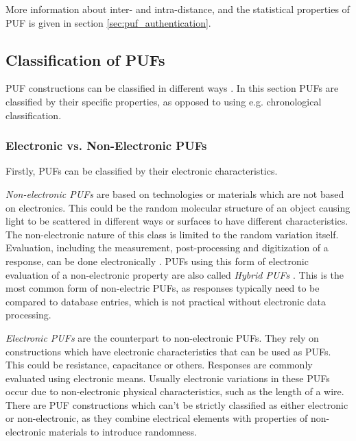 More information about inter- and intra-distance, and the statistical properties of PUF is given in section \ref{sec:puf_authentication}.

\subsection{Classification of PUFs}
\label{sec:classification}

PUF constructions can be classified in different ways \cite[][p. 4ff]{McGrath2019}.
In this section PUFs are classified by their specific properties, as opposed to using
e.g. chronological classification.

\subsubsection{Electronic vs. Non-Electronic PUFs}

Firstly, PUFs can be classified by their electronic characteristics. \cite[][p. 22]{Maes2013}


\emph{Non-electronic PUFs} are based on technologies or materials which are not based on electronics.
This could be the random molecular structure of an object causing light to be scattered in different ways or surfaces
to have different characteristics.
The non-electronic nature of this class is limited to the random variation itself.
Evaluation, including the measurement, post-processing and digitization of a response, can be done electronically \cite[][p. 22]{Maes2013}.
PUFs using this form of electronic evaluation of a non-electronic property are also called \emph{Hybrid PUFs} \cite[][p.]{McGrath2019}.
This is the most common form of non-electric PUFs, as responses typically need to be compared to database entries,
which is not practical without electronic data processing.

\emph{Electronic PUFs} are the counterpart to non-electronic PUFs.
They rely on constructions which have electronic characteristics that can be used as PUFs.
This could be resistance, capacitance or others.
Responses are commonly evaluated using electronic means.
Usually electronic variations in these PUFs occur due to non-electronic physical characteristics, such as the
length of a wire.
There are PUF constructions which can't be strictly classified as either electronic or non-electronic,
as they combine electrical elements with properties of non-electronic materials to introduce randomness.
\cite[][p.22f]{Maes2013}

